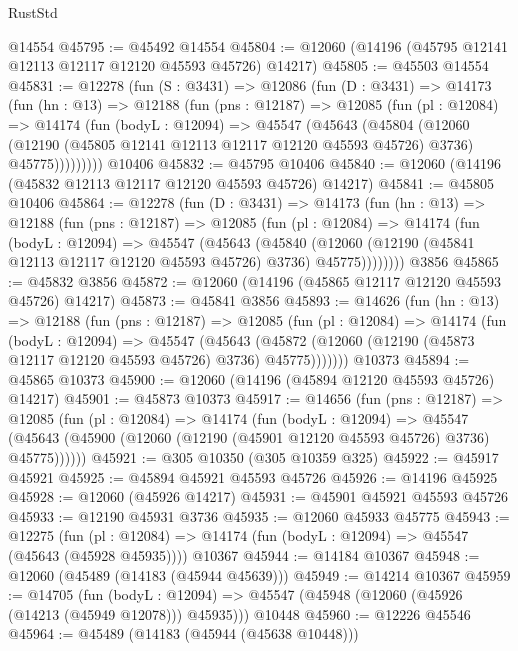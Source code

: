 \begin{lexlean}{RustStd}
\begin{coremodule}
    @14554
@45795 := @45492 @14554
@45804 := @12060 (@14196 (@45795 @12141 @12113 @12117 @12120 @45593 @45726) @14217)
@45805 := @45503 @14554
@45831 := @12278
    (fun (S : @3431) =>
    @12086
      (fun (D : @3431) =>
      @14173
        (fun (hn : @13) =>
        @12188
          (fun (pns : @12187) =>
          @12085
            (fun (pl : @12084) =>
            @14174
              (fun (bodyL : @12094) =>
              @45547
                (@45643
                  (@45804
                    (@12060
                      (@12190 (@45805 @12141 @12113 @12117 @12120 @45593 @45726) @3736)
                      @45775)))))))))
    @10406
@45832 := @45795 @10406
@45840 := @12060 (@14196 (@45832 @12113 @12117 @12120 @45593 @45726) @14217)
@45841 := @45805 @10406
@45864 := @12278
    (fun (D : @3431) =>
    @14173
      (fun (hn : @13) =>
      @12188
        (fun (pns : @12187) =>
        @12085
          (fun (pl : @12084) =>
          @14174
            (fun (bodyL : @12094) =>
            @45547
              (@45643
                (@45840
                  (@12060 (@12190 (@45841 @12113 @12117 @12120 @45593 @45726) @3736) @45775))))))))
    @3856
@45865 := @45832 @3856
@45872 := @12060 (@14196 (@45865 @12117 @12120 @45593 @45726) @14217)
@45873 := @45841 @3856
@45893 := @14626
    (fun (hn : @13) =>
    @12188
      (fun (pns : @12187) =>
      @12085
        (fun (pl : @12084) =>
        @14174
          (fun (bodyL : @12094) =>
          @45547
            (@45643
              (@45872 (@12060 (@12190 (@45873 @12117 @12120 @45593 @45726) @3736) @45775)))))))
    @10373
@45894 := @45865 @10373
@45900 := @12060 (@14196 (@45894 @12120 @45593 @45726) @14217)
@45901 := @45873 @10373
@45917 := @14656
    (fun (pns : @12187) =>
    @12085
      (fun (pl : @12084) =>
      @14174
        (fun (bodyL : @12094) =>
        @45547 (@45643 (@45900 (@12060 (@12190 (@45901 @12120 @45593 @45726) @3736) @45775))))))
@45921 := @305 @10350 (@305 @10359 @325)
@45922 := @45917 @45921
@45925 := @45894 @45921 @45593 @45726
@45926 := @14196 @45925
@45928 := @12060 (@45926 @14217)
@45931 := @45901 @45921 @45593 @45726
@45933 := @12190 @45931 @3736
@45935 := @12060 @45933 @45775
@45943 := @12275
    (fun (pl : @12084) => @14174 (fun (bodyL : @12094) => @45547 (@45643 (@45928 @45935))))
    @10367
@45944 := @14184 @10367
@45948 := @12060 (@45489 (@14183 (@45944 @45639)))
@45949 := @14214 @10367
@45959 := @14705
    (fun (bodyL : @12094) => @45547 (@45948 (@12060 (@45926 (@14213 (@45949 @12078))) @45935)))
    @10448
@45960 := @12226 @45546
@45964 := @45489 (@14183 (@45944 (@45638 @10448)))

\end{coremodule}
\end{lexlean}
